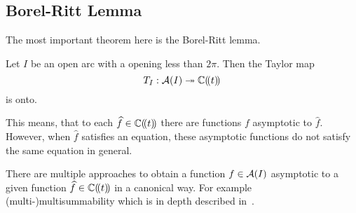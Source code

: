 \subsection{Borel-Ritt Lemma}
\begin{comment}
  \begin{itemize}
    \item \cite[Lem.II.2.2.5]{sabbah_cimpa90}: $T_I$
    \item \textbf{\cite[Th.7.3]{van2003galois}}: $T_I=T_{(a,b)}$
    \item \cite[Th.2.4.1]{Loday2014}: $T_{\mathfrak{s}}$
    \item \cite[4.4.Thm.16]{Balser2000Formal}
  \end{itemize}
\end{comment}
The most important theorem here is the Borel-Ritt lemma.
\begin{thm}
  \label{thm:borel-ritt}
  Let $I$ be an open arc with a opening less than $2\pi$. Then the Taylor map
  \[
    T_{I}:\mathcal{A}(I)\twoheadrightarrow\mathbb{C}(\!(t)\!)
  \]
  is onto.
  \begin{s-rem}
    This means, that to each $\widehat f\in\mathbb{C}(\!(t)\!)$ there are functions $f$
    asymptotic to $\hat f$.
    However, when $\hat f$ satisfies an equation, these asymptotic functions do
    not satisfy the same equation in general.
     
  \end{s-rem}
\end{thm}
There are multiple approaches to obtain a function $f\in\mathcal{A}(I)$ asymptotic to a
given function $\widehat f\in\mathbb{C}(\!(t)\!)$ in a canonical way. For example
(multi-)multisummability which is in depth described in~\cite{Loday2014}.
